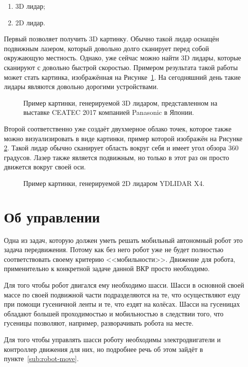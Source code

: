 \begin{enumerate}
\item 3D лидар;
\item 2D лидар.
\end{enumerate} 

Первый позволяет получить 3D картинку. Обычно такой лидар оснащён подвижным лазером, который довольно долго сканирует перед собой окружающую местность. Однако, уже сейчас можно найти 3D лидары, которые сканируют с довольно быстрой скоростью\cite[с. 308]{hutter2017field}. Примером результата такой работы может стать картинка, изображённая на Рисунке~\ref{fig:3D-lidar-example}. На сегодняшний день такие лидары являются довольно дорогими устройствами.

\begin{figure}[ht]
  \caption{Пример картинки, генерируемой 3D лидаром, представленном на выставке CEATEC 2017 компанией Panasonic в Японии.}\label{fig:3D-lidar-example}
\end{figure}

Второй соответственно уже создаёт двухмерное облако точек, которое также можно визуализировать в виде картинки, пример которой изображён на Рисунке \ref{fig:ydlidar-pointcloud}. Такой лидар обычно сканирует область вокруг себя и имеет угол обзора 360 градусов. Лазер также является подвижным, но только в этот раз он просто движется вокруг своей оси\cite[с. 610]{jia2019proceedings}.

\begin{figure}[ht]
  \caption{Пример картинки, генерируемой 2D лидаром YDLIDAR X4.}\label{fig:ydlidar-pointcloud}
\end{figure}

\section{Об управлении} \label{sec:about-driving}
Одна из задач, которую должен уметь решать мобильный автономный робот это задача передвижения. Потому как без него робот уже не будет полностью соответствовать своему критерию <<мобильности>>. Движение для робота, применительно к конкретной задаче данной ВКР просто необходимо. 

Для того чтобы робот двигался ему необходимо шасси. Шасси в основной своей массе по своей подвижной части подразделяются на те, что осуществляют езду при помощи гусеничной ленты и те, что ездят на колёсах. Шасси на гусеницах обладают большей проходимостью и мобильностью в следствии того, что гусеницы позволяют, например, разворачивать робота на месте.

Для того чтобы управлять шасси роботу необходимы электродвигатели и контроллер движения для них, но подробнее речь об этом зайдёт в пункте~\ref{sub:robot-move}. 

\FloatBarrier
